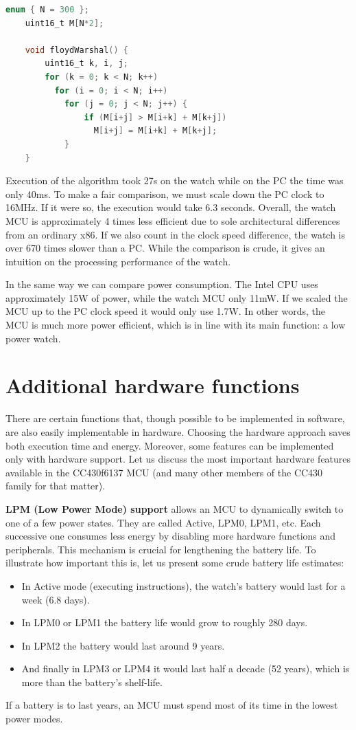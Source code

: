 \begin{lstlisting}[numbers=none, keywordstyle=\bfseries, language=C]
    enum { N = 300 };
    uint16_t M[N*2];

    void floydWarshal() {
        uint16_t k, i, j;
        for (k = 0; k < N; k++)
          for (i = 0; i < N; i++)
            for (j = 0; j < N; j++) {
                if (M[i+j] > M[i+k] + M[k+j])
                  M[i+j] = M[i+k] + M[k+j];
            }
    }
\end{lstlisting}

Execution of the algorithm took 27s on the watch while on the PC the
time was only 40ms.  To make a fair comparison, we must scale down the
PC clock to 16MHz. If it were so, the execution would take 6.3
seconds. Overall, the watch MCU is approximately 4 times less
efficient due to sole architectural differences from an ordinary x86.
If we also count in the clock speed difference, the watch is over 670
times slower than a PC. While the comparison is crude, it gives an
intuition on the processing performance of the watch.

In the same way we can compare power consumption.  The Intel CPU uses
approximately 15W of power, while the watch MCU only 11mW. If we
scaled the MCU up to the PC clock speed it would only use 1.7W. In
other words, the MCU is much more power efficient, which is in line
with its main function: a low power watch.

\section{Additional hardware functions}

There are certain functions that, though possible to be implemented in
software, are also easily implementable in hardware. Choosing the
hardware approach saves both execution time and energy. Moreover, some
features can be implemented only with hardware support. Let us discuss
the most important hardware features available in the CC430f6137 MCU
(and many other members of the CC430 family for that matter).

{\bf LPM (Low Power Mode) support} allows an MCU to dynamically switch to
one of a few power states.  They are called Active, LPM0, LPM1, etc.
Each successive one consumes less energy by disabling more hardware
functions and peripherals. This mechanism is crucial for lengthening
the battery life. To illustrate how important this is, let us present
some crude battery life estimates:

\begin{itemize}
    \item In Active mode (executing instructions), the watch's battery
      would last for a week (6.8 days).
    \item In LPM0 or LPM1 the battery life would grow to roughly 280 days.
    \item In LPM2 the battery would last around 9 years.
    \item And finally in LPM3 or LPM4 it would last half a decade (52
    years), which is more than the battery's shelf-life.
\end{itemize}
If a battery is to last years, an MCU must spend most of its time in
the lowest power modes.

